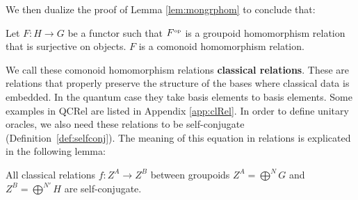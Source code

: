 We then dualize the proof of Lemma \ref{lem:mongrphom} to conclude that:
\begin{lemma}
\label{lem:classicalRelation}
Let $F:H\to G$ be a functor such that $F^{\mbox{\tiny op}}$ is a groupoid homomorphism relation that is surjective on objects. $F$ is a comonoid homomorphism relation.
\end{lemma}
\noindent We call these comonoid homomorphism relations \textbf{classical relations}. These are relations that properly preserve the structure of the bases where classical data is embedded.  In the quantum case they take basis elements to basis elements. Some examples in QCRel are listed in Appendix \ref{app:clRel}. In order to define unitary oracles, we also need these relations to be self-conjugate (Definition~\ref{def:selfconj}). The meaning of this equation in relations is explicated in the following lemma:
\begin{lemma}
All classical relations $f:Z^A\to Z^B$ between groupoids $Z^A=\bigoplus^NG$ and $Z^B=\bigoplus^{N'}H$ are self-conjugate.
\end{lemma}
